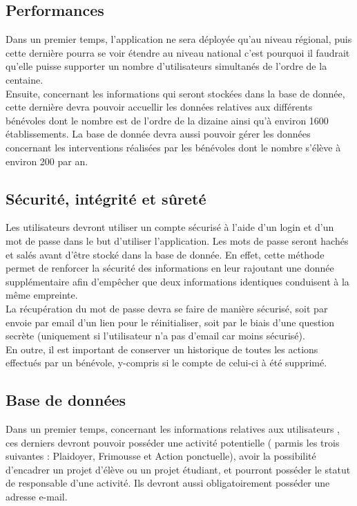 \subsection{Performances}

Dans un premier temps, l'application ne sera déployée qu'au niveau régional, puis cette dernière pourra se voir étendre au niveau national c'est pourquoi il faudrait qu'elle puisse supporter un nombre d'utilisateurs simultanés de l'ordre de la centaine. \\

Ensuite, concernant les informations qui seront stockées dans la base de donnée, cette dernière devra pouvoir accuellir les données relatives aux différents bénévoles dont le nombre est de l'ordre de la dizaine ainsi qu'à environ 1600 établissements. La base de donnée devra aussi pouvoir gérer les données concernant les interventions réalisées par les bénévoles dont le nombre s'élève à environ 200 par an.

\subsection{Sécurité, intégrité et sûreté}

Les utilisateurs devront utiliser un compte sécurisé à l'aide d'un login et d'un mot de passe dans le but d'utiliser l'application. Les mots de passe seront hachés et salés avant d'être stocké dans la base de donnée. En effet, cette méthode permet de renforcer la sécurité des informations en leur rajoutant une donnée supplémentaire afin d'empêcher que deux informations identiques conduisent à la même empreinte. \\

 La récupération du mot de passe devra se faire de manière sécurisé, soit par envoie par email d'un lien pour le réinitialiser, soit par le biais d'une question secrète (uniquement si l'utilisateur n'a pas d'email car moins sécurisé).\\

En outre, il est important de conserver un historique de toutes les actions effectués par un bénévole, y-compris si le compte de celui-ci à été supprimé. 

\subsection{Base de données}

Dans un premier temps, concernant les informations relatives aux utilisateurs , ces derniers devront pouvoir posséder une activité potentielle ( parmis les trois suivantes : Plaidoyer, Frimousse et Action ponctuelle), avoir la possibilité d'encadrer un projet d'élève ou un projet étudiant, et pourront posséder le statut de responsable d'une activité. Ils devront aussi obligatoirement posséder une adresse e-mail. \\

